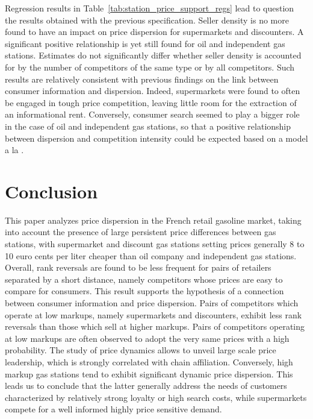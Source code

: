 \documentclass[english]{article}
\begin{document}
Regression results in Table~\ref{tab:station_price_support_regs} lead to question the results obtained with the previous specification. Seller density is no more found to have an impact on price dispersion for supermarkets and discounters. A significant positive relationship is yet still found for oil and independent gas stations. Estimates do not significantly differ whether seller density is accounted for by the number of competitors of the same type or by all competitors. Such results are relatively consistent with previous findings on the link between consumer information and dispersion. Indeed, supermarkets were found to often be engaged in tough price competition, leaving little room for the extraction of an informational rent. Conversely, consumer search seemed to play a bigger role in the case of oil and independent gas stations, so that a positive relationship between dispersion and competition intensity could be expected based on a model a la \cite{VAR80}.

\section{Conclusion}

This paper analyzes price dispersion in the French retail gasoline market, taking into account the presence of large persistent price differences between gas stations, with supermarket and discount gas stations setting prices generally 8 to 10 euro cents per liter cheaper than oil company and independent gas stations. Overall, rank reversals are  found to be less frequent for pairs of retailers separated by a short distance, namely competitors whose prices are easy to compare for consumers. This result supports the hypothesis of a connection between consumer information and price dispersion. Pairs of competitors which operate at low markups, namely supermarkets and discounters, exhibit less rank reversals than those which sell at higher markups. Pairs of competitors operating at low markups are often observed to adopt the very same prices with a high probability. The study of price dynamics allows to unveil large scale price leadership, which is strongly correlated with chain affiliation. Conversely, high markup gas stations tend to exhibit significant dynamic price dispersion. This leads us to conclude that the latter generally address the needs of customers characterized by relatively strong loyalty or high search costs, while supermarkets compete for a well informed highly price sensitive demand.
\end{document}
